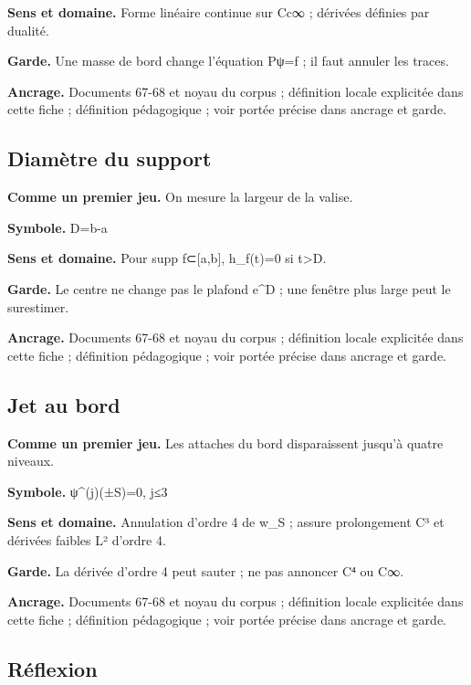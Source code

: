 \documentclass[
  9pt,
  a4paper,
]{article}
\begin{document}
\textbf{Sens et domaine.} Forme linéaire continue sur Cc∞ ; dérivées
définies par dualité.

\textbf{Garde.} Une masse de bord change l'équation Pψ=f ; il faut
annuler les traces.

\textbf{Ancrage.} Documents 67-68 et noyau du corpus ; définition locale
explicitée dans cette fiche ; définition pédagogique ; voir portée
précise dans ancrage et garde.

\hypertarget{diamuxe8tre-du-support}{%
\subsection{Diamètre du support}\label{diamuxe8tre-du-support}}

\textbf{Comme un premier jeu.} On mesure la largeur de la valise.

\textbf{Symbole.} D=b-a

\textbf{Sens et domaine.} Pour supp f⊂{[}a,b{]}, h\_f(t)=0 si
\textbar t\textbar\textgreater D.

\textbf{Garde.} Le centre ne change pas le plafond e\^{}D ; une fenêtre
plus large peut le surestimer.

\textbf{Ancrage.} Documents 67-68 et noyau du corpus ; définition locale
explicitée dans cette fiche ; définition pédagogique ; voir portée
précise dans ancrage et garde.

\hypertarget{jet-au-bord}{%
\subsection{Jet au bord}\label{jet-au-bord}}

\textbf{Comme un premier jeu.} Les attaches du bord disparaissent
jusqu'à quatre niveaux.

\textbf{Symbole.} ψ\^{}(j)(±S)=0, j≤3

\textbf{Sens et domaine.} Annulation d'ordre 4 de w\_S ; assure
prolongement C³ et dérivées faibles L² d'ordre 4.

\textbf{Garde.} La dérivée d'ordre 4 peut sauter ; ne pas annoncer C⁴ ou
C∞.

\textbf{Ancrage.} Documents 67-68 et noyau du corpus ; définition locale
explicitée dans cette fiche ; définition pédagogique ; voir portée
précise dans ancrage et garde.

\hypertarget{ruxe9flexion}{%
\subsection{Réflexion}\label{ruxe9flexion}}
\end{document}
